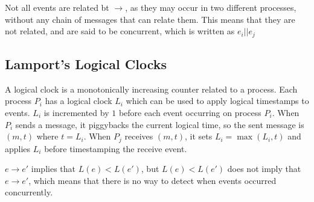 Not all events are related bt $\rightarrow$, as they may occur in two different processes, without any chain of messages that can relate them. This means that they are not related, and are said to be concurrent, which is written as $e_i || e_j$

\subsection*{Lamport's Logical Clocks}

A logical clock is a monotonically increasing counter related to a process. Each process $P_i$ has a logical clock $L_i$ which can be used to apply logical timestamps to events. $L_i$ is incremented by $1$ before each event occurring on process $P_i$. When $P_i$ sends a message, it piggybacks the current logical time, so the sent message is $(m, t)$ where $t = L_i$. When $P_j$ receives $(m, t)$, it sets $L_i = \max(L_i, t)$ and applies $L_i$ before timestamping the receive event.

$e \rightarrow e'$ implies that $L(e) < L(e')$, but $L(e) < L(e')$ does not imply that $e \rightarrow e'$, which means that there is no way to detect when events occurred concurrently.